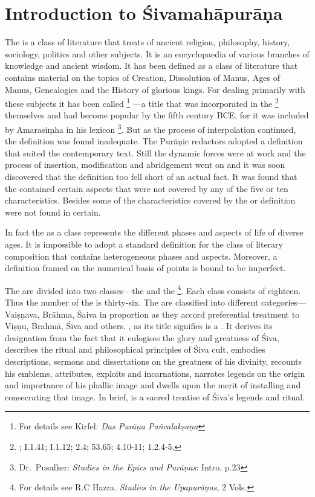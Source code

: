 {}
\section*{Introduction to Śivamahāpurāṇa}

The  is a class of literature that treats of ancient religion,
philosophy, history, sociology, politics and other subjects. It is an
encyclopaedia of various branches of knowledge and ancient wisdom. It has been
defined as a class of literature that contains material on the topics of
Creation, Dissolution of Manus, Ages of Manus, Genealogies and the History of
glorious kings. For dealing primarily with these subjects it has been called
\footnote{For details see Kirfel: \emph{Das Purāṇa Pañcalakṣaṇa}}
—a title that was incorporated in the \footnote{;
 I.1.41;  I.1.12;  2.4;  53.65;
 4.10-11;  1.2.4-5.} themselves and had become popular by
the fifth century BCE, for it was included by Amarasiṃha in his lexicon 
\footnote{Dr.~Pusalker: \emph{Studies in the Epics and Purāṇas}: Intro. p.23}.
But as the process of interpolation continued, the  definition
was found inadequate. The Purāṇic redactors adopted a  definition
that suited the contemporary text. Still the dynamic forces were at work and
the process of insertion, modification and abridgement went on and it was soon
discovered that the  definition too fell short of an actual fact.
It was found that the contained certain aspects that were not
covered by any of the five or ten characteristics. Besides some of the
characteristics covered by the  or  definition
were not found in certain.

In fact the  as a class represents the different phases and aspects
of life of diverse ages. It is impossible to adopt a standard definition for
the class of literary composition that contains heterogeneous phases and aspects.
Moreover, a definition framed on the numerical basis of points is bound to be
imperfect.

The are divided into two classes—the  and
the  \footnote{For details see R.C Hazra. \emph{Studies in
the Upapurāṇas}, 2 Vols.}. Each class consists of eighteen. Thus
the number of the is thirty-six. The  are
classified into different categories—Vaiṣṇava, Brāhma, Śaiva \etc in proportion
as they accord preferential treatment to Viṣṇu, Brahmā, Śiva and others.
, as its title signifies is a . It derives its
designation from the fact that it eulogises the glory and greatness of Śiva,
describes the ritual and philosophical principles of Śiva cult, embodies
descriptions, sermons and dissertations on the greatness of his divinity,
recounts his emblems, attributes, exploits and incarnations, narrates legends on
the origin and importance of his phallic image and dwells upon the merit of
installing and consecrating that image. In brief,  is a sacred
treatise of Śiva’s legends and ritual.

